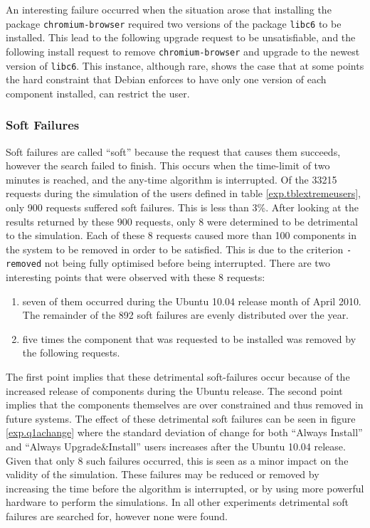 An interesting failure occurred when the situation arose that installing the package \texttt{chromium-browser} required two versions of the package \texttt{libc6} to be installed. 
This lead to the following upgrade request to be unsatisfiable, and the following install request to remove \texttt{chromium-browser} and upgrade to the newest version of \texttt{libc6}.
This instance, although rare, shows the case that at some points the hard constraint that Debian enforces to have only one version of each component installed,
can restrict the user.

\subsubsection{Soft Failures}
Soft failures are called ``soft'' because the request that causes them succeeds, however the search failed to finish.
This occurs when the time-limit of two minutes is reached, and the any-time algorithm is interrupted.
Of the 33215 requests during the simulation of the users defined in table \ref{exp.tblextremeusers},
only 900 requests suffered soft failures.
This is less than 3\%.
After looking at the results returned by these 900 requests,
only 8 were determined to be detrimental to the simulation.
Each of these 8 requests caused more than 100 components in the system to be removed in order to be satisfied.
This is due to the criterion \texttt{-removed} not being fully optimised before being interrupted.
There are two interesting points that were observed with these 8 requests:
\begin{enumerate}
  \item seven of them occurred during the Ubuntu 10.04 release month of April 2010. The remainder of the 892 soft failures are evenly distributed over the year.
  \item five times the component that was requested to be installed was removed by the following requests.
\end{enumerate}
The first point implies that these detrimental soft-failures occur because of the increased release of components during the Ubuntu release.
The second point implies that the components themselves are over constrained and thus removed in future systems.
The effect of these detrimental soft failures can be seen in figure \ref{exp.q1achange} 
where the standard deviation of change for both ``Always Install'' and ``Always Upgrade\&Install'' users increases after the Ubuntu 10.04 release.
Given that only 8 such failures occurred, this is seen as a minor impact on the validity of the simulation.
These failures may be reduced or removed by increasing the time before the algorithm is interrupted, or by using more powerful hardware to perform the simulations.
In all other experiments detrimental soft failures are searched for, however none were found.


